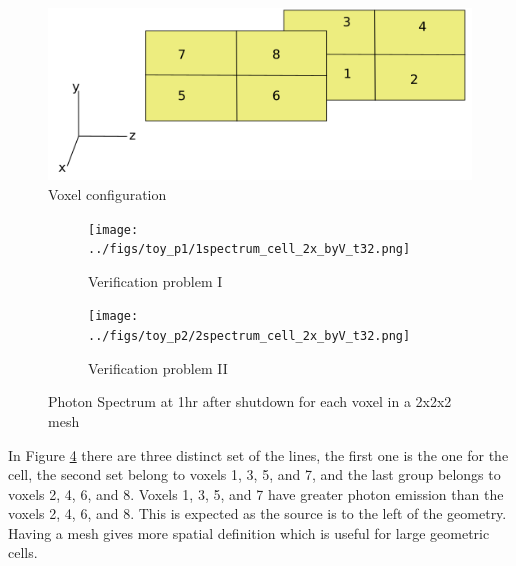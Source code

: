 \begin{figure}[h]
\begin{centering}
\includegraphics[width=0.60\linewidth]{../figs/voxels.png}
\caption{Voxel configuration}
\label{voxels}
\end{centering}
\end{figure}

\begin{figure}[h]
 \begin{centering}
 \centering
 \begin{subfigure}[b]{.45\textwidth}
 \texttt{[image: ../figs/toy\_p1/1spectrum\_cell\_2x\_byV\_t32.png]}
 \caption{Verification problem I }
 \label{1spect_cell_2x_byV}
 \end{subfigure}
 \hspace{0.05cm}
 \begin{subfigure}[b]{.45\textwidth}
 \centering
 \texttt{[image: ../figs/toy\_p2/2spectrum\_cell\_2x\_byV\_t32.png]}
 \caption{Verification problem II}
 \label{2spect_cell_2x_byV}
 \end{subfigure}
 \caption{Photon Spectrum at 1hr after shutdown for each voxel in a 2x2x2 mesh}
 \label{spect_cell_2x_byV}
 \end{centering}
\end{figure}
In Figure \ref{spect_cell_2x_byV} there are three distinct set of the lines, the 
first one is the one for the cell, the second set belong to voxels 1, 3, 5, and 7, and the 
last group belongs to voxels 2, 4, 6, and 8. Voxels 1, 3, 5, and 7 have greater photon emission 
than the voxels 2, 4, 6, and 8. This is expected as the source is to the left of the geometry. 
Having a mesh gives more spatial definition which is useful for large geometric cells. 
\newpage
